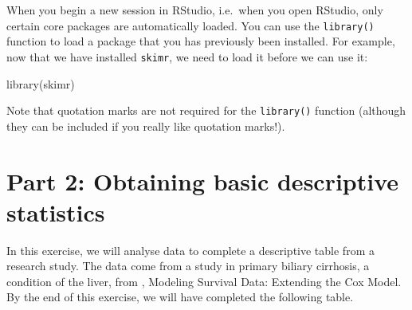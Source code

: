 \documentclass[
]{memoir}
\newenvironment{Shaded}{\begin{snugshade}}{\end{snugshade}}
\newcommand{\FunctionTok}[1]{\textcolor[rgb]{0.00,0.00,0.00}{#1}}
\newcommand{\NormalTok}[1]{#1}
\begin{document}
When you begin a new session in RStudio, i.e.~when you open RStudio, only certain core packages are automatically loaded. You can use the \texttt{library()} function to load a package that you has previously been installed. For example, now that we have installed \texttt{skimr}, we need to load it before we can use it:

\begin{Shaded}
\begin{Highlighting}[]
\FunctionTok{library}\NormalTok{(skimr)}
\end{Highlighting}
\end{Shaded}

Note that quotation marks are not required for the \texttt{library()} function (although they can be included if you really like quotation marks!).

\hypertarget{part-2-obtaining-basic-descriptive-statistics}{%
\section{Part 2: Obtaining basic descriptive statistics}\label{part-2-obtaining-basic-descriptive-statistics}}

In this exercise, we will analyse data to complete a descriptive table from a research study. The data come from a study in primary biliary cirrhosis, a condition of the liver, from \citet{therneau_grambsch10}, Modeling Survival Data: Extending the Cox Model. By the end of this exercise, we will have completed the following table.

 
  \providecommand{\huxb}[2]{\arrayrulecolor[RGB]{#1}\global\arrayrulewidth=#2pt}
  \providecommand{\huxvb}[2]{\color[RGB]{#1}\vrule width #2pt}
  \providecommand{\huxtpad}[1]{\rule{0pt}{#1}}
  \providecommand{\huxbpad}[1]{\rule[-#1]{0pt}{#1}}
\end{document}
